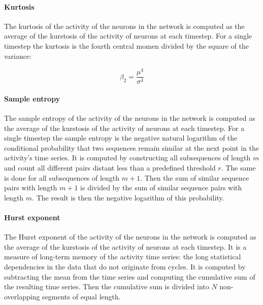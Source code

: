       \paragraph{Kurtosis}
      \label{sec:kurtosis}
      The kurtosis of the activity of the neurons in the network is computed as the average of the kurstosis of the activity of neurons at each timestep.
      For a single timestep the kurtosis is the fourth central momen divided by the square of the variance:

      \begin{equation}
        \beta_2 = \frac{\mu^4}{\sigma^4}
      \end{equation}

      \paragraph{Sample entropy}
      \label{sec:sampen}
      The sample entropy of the activity of the neurons in the network is computed as the average of the kurstosis of the activity of neurons at each timestep.
      For a single timestep the sample entropy is the negative natural logarithm of the conditional probability that two sequences remain similar at the next point in the activity's time series.
      It is computed by constructing all subsequences of length $m$ and count all different pairs distant less than a predefined threshold $r$.
      The same is done for all subsequences of length $m+1$.
      Then the sum of similar sequence pairs with length $m+1$ is divided by the sum of similar sequence pairs with length $m$.
      The result is then the negative logarithm of this probability.

      \paragraph{Hurst exponent}
      \label{sec:hurst}
      The Hurst exponent of the activity of the neurons in the network is computed as the average of the kurstosis of the activity of neurons at each timestep.
      It is a measure of long-term memory of the activity time series: the long statistical dependencies in the data that do not originate from cycles.
      It is computed by subtracting the mean from the time series and computing the cumulative sum of the resulting time series.
      Then the cumulative sum is divided into $N$ non-overlapping segments of equal length.


